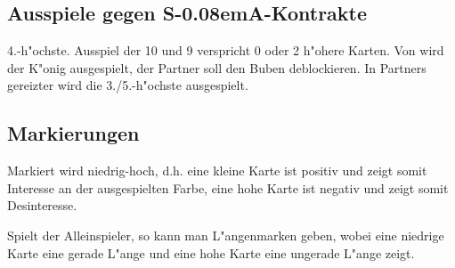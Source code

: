 \documentclass[11pt,german,twocolumn]{scrartcl}
\def\sa{\nobreak\textsf{S\kern-0.08emA}}
\begin{document}
\subsection{Ausspiele gegen \sa-Kontrakte}

4.-h"ochste. Ausspiel der 10 und 9 verspricht 0 oder 2 h"ohere Karten. Von
 wird der K"onig ausgespielt, der Partner soll den Buben deblockieren. In
Partners gereizter wird die 3./5.-h"ochste ausgespielt.

\subsection{Markierungen}

Markiert wird niedrig-hoch, d.h. eine kleine Karte ist positiv und zeigt somit
Interesse an der ausgespielten Farbe, eine hohe Karte ist negativ und zeigt
somit Desinteresse.

Spielt der Alleinspieler, so kann man L"angenmarken geben, wobei eine niedrige
Karte eine gerade L"ange und eine hohe Karte eine ungerade L"ange zeigt.
\end{document}
